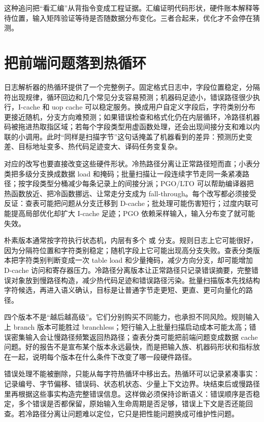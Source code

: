 这种追问把“看汇编”从背指令变成工程证据。汇编证明代码形状，硬件账本解释等待位置，输入矩阵验证等待是否随数据分布变化。三者合起来，优化才不会停在猜测。

\section{把前端问题落到热循环}

日志解析器的热循环提供了一个完整例子。固定格式日志中，字段位置稳定，分隔符出现规律，循环回边和几个常见分支容易预测；机器码足迹小，错误路径很少执行，I-cache 和 uop cache 可以稳定服务。换成用户自定义字段后，字符类别分布更接近随机，分支方向难预测；如果错误检查和格式化仍在内层循环，冷路径机器码被拖进热取指区域；若每个字段类型用虚函数处理，还会出现间接分支和难以内联的小调用。此时“同样是扫描字节”这句话掩盖了机器看到的差异：预测历史变差、目标地址变多、热代码足迹变大、译码任务变复杂。

对应的改写也要直接改变这些硬件形状。冷热路径分离让正常路径短而直；小表分类把多级分支换成数据 load 和掩码；批量扫描让一段连续字节走同一条紧凑路径；按字段类型分桶减少每条记录上的间接分派；PGO/LTO 可以帮助编译器把热函数放近、把冷函数挪远、让常走分支成为 fall-through。每个改写都必须接受反证：查表可能把问题从分支迁移到 D-cache；批处理可能伤害短行；过度内联可能提高局部优化却扩大 I-cache 足迹；PGO 依赖采样输入，输入分布变了就可能失效。

朴素版本通常按字符执行状态机，内层有多个  或  分支。规则日志上它可能很好，因为分隔符位置和字符类别稳定；随机字段上它可能出现高分支失败。查表分类版本把字符类别判断变成一次 table load 和少量掩码，减少方向分支，却可能增加 D-cache 访问和寄存器压力。冷路径分离版本让正常路径只记录错误摘要，完整错误对象放到慢路径构造，减少热代码足迹和错误路径污染。批量扫描版本先找结构字符候选，再进入语义确认，目标是让普通字节走更短、更直、更可向量化的路径。

四个版本不是“越后越高级”。它们分别购买不同能力，也承担不同风险。规则输入上 branch 版本可能胜过 branchless；短行输入上批量扫描启动成本可能太高；错误密集输入会让慢路径频繁返回热路径；查表分类可能把前端问题变成数据 cache 问题。好的报告不是宣布某个版本永远最快，而是把输入族、机器码形状和指标放在一起，说明每个版本在什么条件下改变了哪一段硬件路径。

错误处理不能被删除，只能从每字符热循环中移出去。热循环可以记录紧凑事实：记录编号、字节偏移、错误码、状态机状态、少量上下文边界。块结束后或慢路径里再根据这些事实构造完整错误信息。这样做必须保持诊断语义：错误顺序是否稳定，多个错误是否都保留，原始输入生命周期是否足够，错误上下文是否还能回查。若冷路径分离让问题难以定位，它只是把性能问题换成可维护性问题。

